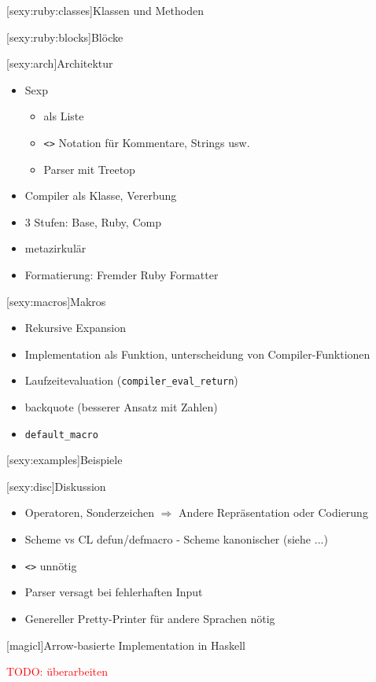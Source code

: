 \documentclass[a4paper, bibgerm]{book}
\newcommand\icode[1]{\lstinline?#1?}
\newcommand{\todo}[1]{
  \textcolor{red}{TODO: #1}
}
\newcommand\lchapter{}
\newcommand\lsection{}
\newcommand\lsubsection{}
\begin{document}
\lsubsection[sexy:ruby:classes]{Klassen und Methoden}

\lsubsection[sexy:ruby:blocks]{Blöcke}

\lsection[sexy:arch]{Architektur}

\begin{itemize}
\item Sexp
  \begin{itemize}
  \item als Liste
  \item \icode{<>} Notation für Kommentare, Strings usw.
  \item Parser mit Treetop
  \end{itemize}
\item Compiler als Klasse, Vererbung
\item 3 Stufen: Base, Ruby, Comp
\item metazirkulär
\item Formatierung: Fremder Ruby Formatter
\end{itemize}

\lsection[sexy:macros]{Makros}

\begin{itemize}
\item Rekursive Expansion
\item Implementation als Funktion, unterscheidung von Compiler-Funktionen
\item Laufzeitevaluation (\icode{compiler_eval_return})
\item backquote (besserer Ansatz mit Zahlen)
\item \icode{default_macro}
\end{itemize}
\lsection[sexy:examples]{Beispiele}

\lsection[sexy:disc]{Diskussion}

\begin{itemize}
\item Operatoren, Sonderzeichen $\Rightarrow$ Andere
  Repräsentation oder Codierung
\item Scheme vs CL defun/defmacro - Scheme kanonischer (siehe ...)
\item \icode{<>} unnötig
\item Parser versagt bei fehlerhaften Input
\item Genereller Pretty-Printer für andere Sprachen nötig
\end{itemize}

\lchapter[magicl]{Arrow-basierte Implementation in Haskell}

\todo{überarbeiten}
\end{document}
